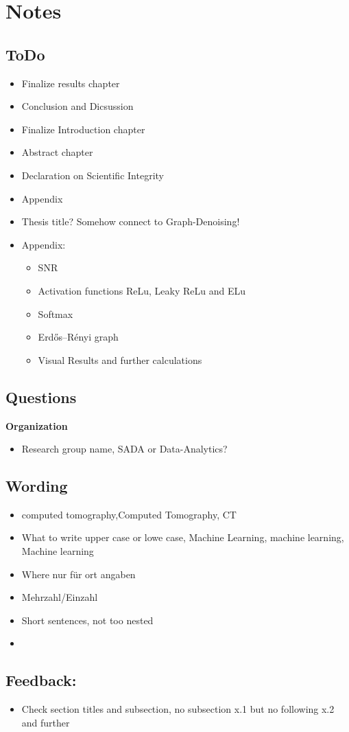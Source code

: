 \chapter{Notes}

\section{ToDo}
\begin{itemize}
    \item Finalize results chapter
    \item Conclusion and Dicsussion
    \item Finalize Introduction chapter
    \item Abstract chapter
    \item Declaration on Scientific Integrity
    \item Appendix
    \item Thesis title? Somehow connect to Graph-Denoising!
    \item Appendix:
    \begin{itemize}
        \item SNR
        \item Activation functions ReLu,  Leaky ReLu and ELu
        \item Softmax
        \item Erdős–Rényi graph
        \item Visual Results and further calculations
    \end{itemize}
\end{itemize}

\section{Questions}
\textbf{Organization}
\begin{itemize}
    \item Research group name, SADA or Data-Analytics?
\end{itemize}


\section{Wording}
\begin{itemize}
    \item computed tomography,Computed Tomography, CT
    \item What to write upper case or lowe case, Machine Learning, machine learning, Machine learning
    \item Where nur für ort angaben
    \item Mehrzahl/Einzahl
    \item Short sentences, not too nested
    \item 
\end{itemize}



\section{Feedback:}
\begin{itemize}
    \item Check section titles and subsection, no subsection x.1 but no following x.2 and further
\end{itemize}


\clearpage
